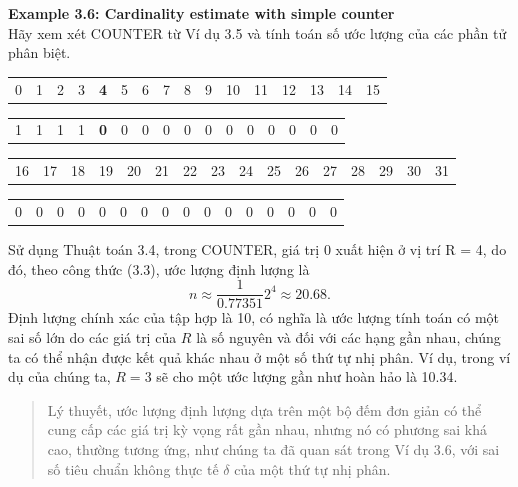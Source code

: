 \documentclass[a4paper,13pt]{article}
\theoremstyle{mytheor}
\begin{document}
\begin{mdframed}
    \vspace{0.25cm}
    \textbf{Example 3.6: Cardinality estimate with simple counter}\\
    Hãy xem xét COUNTER từ Ví dụ 3.5 và tính toán số ước lượng của các phần tử phân biệt.
    \begin{center}
        \begin{tabular}{p{0.4cm}p{0.4cm}p{0.4cm}p{0.4cm}p{0.4cm}p{0.4cm}p{0.4cm}p{0.4cm}p{0.4cm}p{0.4cm}p{0.4cm}p{0.4cm}p{0.4cm}p{0.4cm}p{0.4cm}p{0.4cm}}
            0 & 1 & 2 & 3 & \textbf{4} & 5 & 6 & 7 & 8 & 9 & 10 & 11 & 12 & 13 & 14 & 15 %
        \end{tabular}
        \begin{tabular}{|p{0.4cm}|p{0.4cm}|p{0.4cm}|p{0.4cm}|p{0.4cm}|p{0.4cm}|p{0.4cm}|p{0.4cm}|p{0.4cm}|p{0.4cm}|p{0.4cm}|p{0.4cm}|p{0.4cm}|p{0.4cm}|p{0.4cm}|p{0.4cm}|}
            \hline
            1 & 1 & 1 & 1 & \textbf{0} & 0 & 0 & 0 & 0 & 0 & 0 & 0 & 0 & 0 & 0 & 0 \\ \cline{1-16} %
        \end{tabular}
        \begin{tabular}{p{0.4cm}p{0.4cm}p{0.4cm}p{0.4cm}p{0.4cm}p{0.4cm}p{0.4cm}p{0.4cm}p{0.4cm}p{0.4cm}p{0.4cm}p{0.4cm}p{0.4cm}p{0.4cm}p{0.4cm}p{0.4cm}}
            16 & 17 & 18 & 19 & 20 & 21 & 22 & 23 & 24 & 25 & 26 & 27 & 28 & 29 & 30 & 31 %
        \end{tabular}
        \begin{tabular}{|p{0.4cm}|p{0.4cm}|p{0.4cm}|p{0.4cm}|p{0.4cm}|p{0.4cm}|p{0.4cm}|p{0.4cm}|p{0.4cm}|p{0.4cm}|p{0.4cm}|p{0.4cm}|p{0.4cm}|p{0.4cm}|p{0.4cm}|p{0.4cm}|}
            \hline
            0 & 0 & 0 & 0 & 0 & 0 & 0 & 0 & 0 & 0 & 0 & 0 & 0 & 0 & 0 & 0 \\ \cline{1-16} %
        \end{tabular}
    \end{center}
    Sử dụng Thuật toán 3.4, trong COUNTER, giá trị 0 xuất hiện ở vị trí R = 4, do đó, theo công thức (3.3), ước lượng định lượng là
    \[
        n \approx \frac{1}{0.77351}2^4 \approx 20.68.
    \]
    Định lượng chính xác của tập hợp là 10, có nghĩa là ước lượng tính toán có một sai số lớn do các giá trị của $R$ là số nguyên và đối với các hạng 
    gần nhau, chúng ta có thể nhận được kết quả khác nhau ở một số thứ tự nhị phân. Ví dụ, trong ví dụ của chúng ta, $R = 3$ sẽ cho một ước lượng 
    gần như hoàn hảo là 10.34.
    \vspace{0.25cm}
\end{mdframed}
\begin{quote}
    Lý thuyết, ước lượng định lượng dựa trên một bộ đếm đơn giản có thể cung cấp các giá trị kỳ vọng rất gần nhau, nhưng nó có phương sai khá cao, 
    thường tương ứng, như chúng ta đã quan sát trong Ví dụ 3.6, với sai số tiêu chuẩn không thực tế $\delta$ của một thứ tự nhị phân.
    \vspace{0.25cm}
\end{quote}
\\
\end{document}
